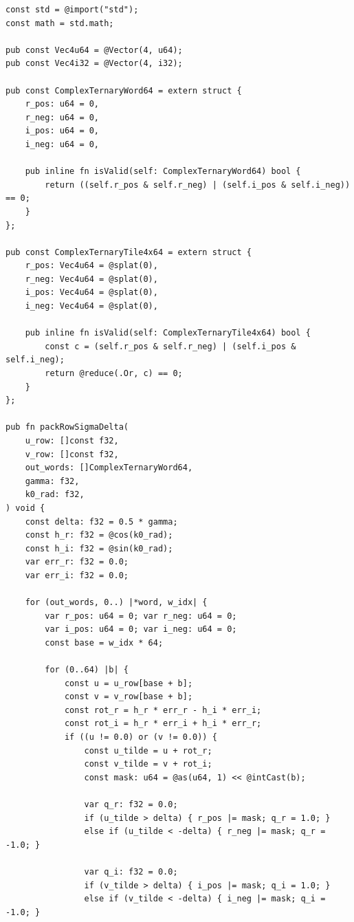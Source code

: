 \documentclass[10pt, twocolumn, a4paper]{article}
\begin{document}
\begin{lstlisting}[caption={Zero-Allocation Zig $\Sigma\Delta$ Bit-Plane Packer (with Sparse-Gap Carrier Phase Tracking) and 32-Bit Safe 4-Row SIMD Contraction Kernel.}]
const std = @import("std");
const math = std.math;

pub const Vec4u64 = @Vector(4, u64);
pub const Vec4i32 = @Vector(4, i32);

pub const ComplexTernaryWord64 = extern struct {
    r_pos: u64 = 0,
    r_neg: u64 = 0,
    i_pos: u64 = 0,
    i_neg: u64 = 0,

    pub inline fn isValid(self: ComplexTernaryWord64) bool {
        return ((self.r_pos & self.r_neg) | (self.i_pos & self.i_neg)) == 0;
    }
};

pub const ComplexTernaryTile4x64 = extern struct {
    r_pos: Vec4u64 = @splat(0),
    r_neg: Vec4u64 = @splat(0),
    i_pos: Vec4u64 = @splat(0),
    i_neg: Vec4u64 = @splat(0),

    pub inline fn isValid(self: ComplexTernaryTile4x64) bool {
        const c = (self.r_pos & self.r_neg) | (self.i_pos & self.i_neg);
        return @reduce(.Or, c) == 0;
    }
};

pub fn packRowSigmaDelta(
    u_row: []const f32,
    v_row: []const f32,
    out_words: []ComplexTernaryWord64,
    gamma: f32,
    k0_rad: f32,
) void {
    const delta: f32 = 0.5 * gamma;
    const h_r: f32 = @cos(k0_rad);
    const h_i: f32 = @sin(k0_rad);
    var err_r: f32 = 0.0;
    var err_i: f32 = 0.0;

    for (out_words, 0..) |*word, w_idx| {
        var r_pos: u64 = 0; var r_neg: u64 = 0;
        var i_pos: u64 = 0; var i_neg: u64 = 0;
        const base = w_idx * 64;

        for (0..64) |b| {
            const u = u_row[base + b];
            const v = v_row[base + b];
            const rot_r = h_r * err_r - h_i * err_i;
            const rot_i = h_r * err_i + h_i * err_r;
            if ((u != 0.0) or (v != 0.0)) {
                const u_tilde = u + rot_r;
                const v_tilde = v + rot_i;
                const mask: u64 = @as(u64, 1) << @intCast(b);

                var q_r: f32 = 0.0;
                if (u_tilde > delta) { r_pos |= mask; q_r = 1.0; }
                else if (u_tilde < -delta) { r_neg |= mask; q_r = -1.0; }

                var q_i: f32 = 0.0;
                if (v_tilde > delta) { i_pos |= mask; q_i = 1.0; }
                else if (v_tilde < -delta) { i_neg |= mask; q_i = -1.0; }


\end{lstlisting}
\end{document}
